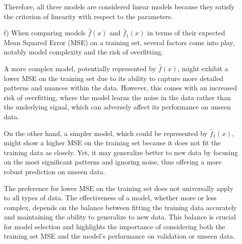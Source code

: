 \documentclass{article}
\begin{document}
\begin{itemize}
Therefore, all three models are considered linear models because they satisfy the criterion of linearity with respect to the parameters.

    \item[f)]
        When comparing models \(\hat{f}(x)\) and \(\hat{f}_1(x)\) in terms of their expected Mean Squared Error (MSE) on a training set, several factors come into play, notably model complexity and the risk of overfitting.

A more complex model, potentially represented by \(\hat{f}(x)\), might exhibit a lower MSE on the training set due to its ability to capture more detailed patterns and nuances within the data. However, this comes with an increased risk of overfitting, where the model learns the noise in the data rather than the underlying signal, which can adversely affect its performance on unseen data.

On the other hand, a simpler model, which could be represented by \(\hat{f}_1(x)\), might show a higher MSE on the training set because it does not fit the training data as closely. Yet, it may generalize better to new data by focusing on the most significant patterns and ignoring noise, thus offering a more robust prediction on unseen data.

The preference for lower MSE on the training set does not universally apply to all types of data. The effectiveness of a model, whether more or less complex, depends on the balance between fitting the training data accurately and maintaining the ability to generalize to new data. This balance is crucial for model selection and highlights the importance of considering both the training set MSE and the model's performance on validation or unseen data.
\end{itemize}
\newpage
\end{document}
